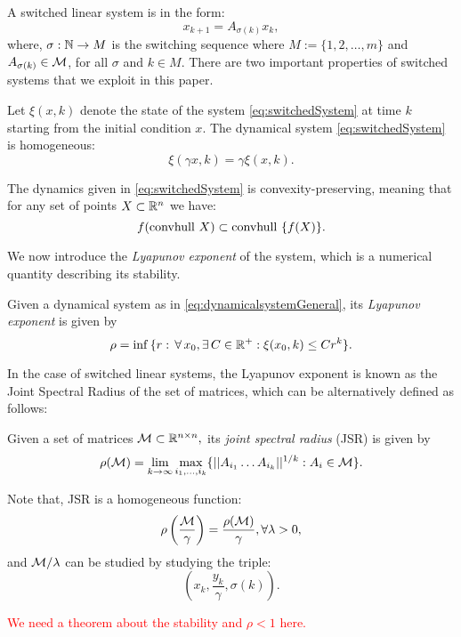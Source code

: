 A switched linear system is in the form:
\begin{equation}\label{eq:switchedSystem}x_{k+1} = A_{\sigma(k)}x_k,\end{equation}
where, $\sigma: \mathbb{N} \to M$ is the switching sequence where \mbox{$M := \{1,2,\dots,m\}$} and $A_{\sigma(k)} \in \mathcal{M}$, for all $\sigma$ and $k \in M$. There are two important properties of switched systems that we exploit in this paper.
\begin{property}\label{property:homogeneity}
Let $\xi(x, k)$ denote the state of the system \eqref{eq:switchedSystem} at time $k$ starting from the initial condition $x$. The dynamical system \eqref{eq:switchedSystem} is homogeneous:
$$\xi(\gamma x, k)= \gamma \xi(x, k). $$
\end{property}
\begin{property}\label{property:convpres}
The dynamics given in \eqref{eq:switchedSystem} is convexity-preserving, meaning that for any set of points $X \subset \mathbb{R}^n$ we have:
$$ f(\mbox{convhull }{X})\subset \mbox{convhull }\{f(X)\}. $$
\end{property}

We now introduce the \emph{Lyapunov exponent} of the system, which is a numerical quantity describing its stability.
\begin{definition}   Given a dynamical system as in \eqref{eq:dynamicalsystemGeneral}, its \emph{Lyapunov exponent} is given by
$$\rho =\inf{\{r:\,\forall\, x_0, \exists\, C\in \mathbb{R}^+: \xi(x_0, k)\leq Cr^k\}}. $$
\end{definition}

In the case of switched linear systems, the Lyapunov exponent is known as the Joint Spectral Radius of the set of matrices, which can be alternatively defined as follows:
\begin{definition} \cite{jungers_lncis} Given a set of matrices $\mathcal{M} \subset \mathbb{R}^{n\times n},$ its \emph{joint spectral radius} (JSR) is given by
$$\rho(\mathcal{M}) =\lim_{k\rightarrow \infty} \max_{i_1,\dots, i_k}\{||A_{i_1} \dots A_{i_k}||^{1/k}: A_i\in\mathcal{M}\}. $$
\end{definition}

\begin{remark}\label{rem:scaling}
Note that, JSR is a homogeneous function:
$$\rho\left(\frac{\mathcal{M}}{\gamma}\right)=\frac{\rho(\mathcal{M})}{\gamma}, \forall \lambda>0, $$ and $\mathcal{M}/\lambda$ can be studied by studying the triple: $$\left(x_k, \frac{y_k}{\gamma},\sigma(k)\right).$$
\end{remark}

\textcolor{red}{We need  a theorem about the stability and $\rho<1$ here.}
